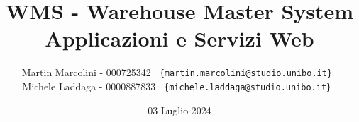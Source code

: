 
\begin{titlepage}
    \title{\LARGE WMS - Warehouse Master System \\[10pt] \large Applicazioni e Servizi Web}
    \author{
        Martin Marcolini - 000725342 \texttt{ \{martin.marcolini@studio.unibo.it\} } \\[10pt]
        Michele Laddaga - 0000887833 \texttt{ \{michele.laddaga@studio.unibo.it\} }
    }
    \date{03 Luglio 2024}
    \maketitle
\end{titlepage}
